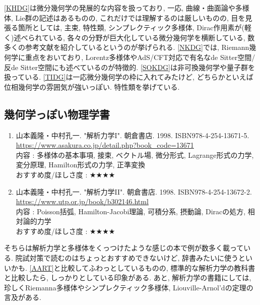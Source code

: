 \documentclass[10pt,a4paper]{jsarticle}
\begin{document}
    \ref{KHDG}は微分幾何学の発展的な内容を扱っており, 一応, 曲線・曲面論や多様体, Lie群の記述はあるものの, これだけでは理解するのは厳しいものの, 目を見張る箇所としては, 主束, 特性類, シンプレクティック多様体, Dirac作用素が(軽く)述べられている, 各々の分野が巨大化している微分幾何学を横断している, 数多くの参考文献を紹介しているというのが挙げられる. \ref{NKDG}では, Riemann幾何学に重点をおいており, Lorentz多様体やAdS/CFT対応で有名なde Sitter空間/反de Sitter空間にも述べているのが特徴的. \ref{SOKDG}は非可換幾何学や量子群を扱っている. \ref{TIDG}は一応微分幾何学の枠に入れてみたけど, どちらかといえば位相幾何学の雰囲気が強いっぽい. 特性類を挙げている. 
\subsection{幾何学っぽい物理学書}
    \begin{enumerate}
        \renewcommand{\theenumi}{[AM\arabic{enumi}]}
        \renewcommand{\labelenumi}{\theenumi}
        \setcounter{enumi}{0}
        \item \label{YNAM1} 山本義隆・中村孔一. "解析力学I". 朝倉書店. 1998. ISBN978-4-254-13671-5. \\
        \url{https://www.asakura.co.jp/detail.php?book_code=13671} \\
        内容 : 多様体の基本事項, 接束, ベクトル場, 微分形式, Lagrange形式の力学, 変分原理, Hamilton形式の力学, 正準変換\\
        おすすめ度/ほしさ度 : $\bigstar \bigstar \bigstar \bigstar $
        \item \label{YNAM2} 山本義隆・中村孔一. "解析力学II". 朝倉書店. 1998. ISBN978-4-254-13672-2. \\
        \url{https://www.utp.or.jp/book/b302146.html} \\
        内容 : Poisson括弧, Hamilton-Jacobi理論, 可積分系, 摂動論, Diracの処方, 相対論的力学\\
        おすすめ度/ほしさ度 : $\bigstar \bigstar \bigstar \bigstar $
    \end{enumerate}\par  
    そちらは解析力学と多様体をくっつけたような感じの本で例が数多く載っている. 院試対策で読むのはちょっとおすすめできないけど, 辞書みたいに使うといいかも. \ref{AART}と比較してふわっとしているものの, 標準的な解析力学の教科書と比較したら, しっかりとしている印象がある. あと, 解析力学の書籍にしては, 珍しくRiemanna多様体やシンプレクティック多様体, Liouville-Arnol'dの定理の言及がある.  
\end{document}
